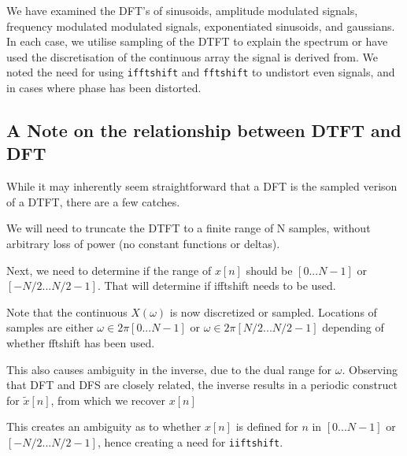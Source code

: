 \documentclass[11pt]{article}
\begin{document}
We have examined the DFT's of sinusoids, amplitude modulated signals,
frequency modulated modulated signals, exponentiated sinusoids, and
gaussians. In each case, we utilise sampling of the DTFT to explain the
spectrum or have used the discretisation of the continuous array the
signal is derived from. We noted the need for using \texttt{ifftshift}
and \texttt{fftshift} to undistort even signals, and in cases where
phase has been distorted.

\subsection{A Note on the relationship between DTFT and
DFT}\label{a-note-on-the-relationship-between-dtft-and-dft}

While it may inherently seem straightforward that a DFT is the sampled
verison of a DTFT, there are a few catches.

We will need to truncate the DTFT to a finite range of N samples,
without arbitrary loss of power (no constant functions or deltas).

Next, we need to determine if the range of \(x[n]\) should be
\([0...N-1]\) or \([-N/2...N/2-1]\). That will determine if ifftshift
needs to be used.

Note that the continuous \(X (\omega)\) is now discretized or sampled.
Locations of samples are either \(\omega ∈ 2\pi [0...N − 1]\) or
\(\omega ∈ 2\pi [ N / 2...N / 2 − 1]\) depending of whether fftshift has
been used.

This also causes ambiguity in the inverse, due to the dual range for
\(\omega\). Observing that DFT and DFS are closely related, the inverse
results in a periodic construct for \(\tilde{x}[n]\), from which we
recover \(x[n]\)

This creates an ambiguity as to whether \(x[n]\) is defined for \(n\) in
\([0...N-1]\) or \([-N/2...N/2-1]\), hence creating a need for
\texttt{iiftshift}.


    
    
    
    
\end{document}
